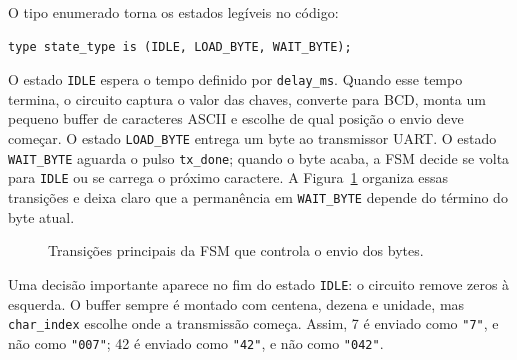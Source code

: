 \documentclass[12pt,a4paper]{book}
\begin{document}
O tipo enumerado torna os estados legíveis no código:

\begin{lstlisting}[caption={Estados usados para controlar o envio da linha.}]
type state_type is (IDLE, LOAD_BYTE, WAIT_BYTE);
\end{lstlisting}

O estado \texttt{IDLE} espera o tempo definido por \texttt{delay\_ms}. Quando esse tempo termina, o circuito captura o valor das chaves, converte para BCD, monta um pequeno buffer de caracteres ASCII e escolhe de qual posição o envio deve começar. O estado \texttt{LOAD\_BYTE} entrega um byte ao transmissor UART. O estado \texttt{WAIT\_BYTE} aguarda o pulso \texttt{tx\_done}; quando o byte acaba, a FSM decide se volta para \texttt{IDLE} ou se carrega o próximo caractere. A Figura~\ref{fig:fsm-envio} organiza essas transições e deixa claro que a permanência em \texttt{WAIT\_BYTE} depende do término do byte atual.

\begin{figure}[h]
\centering
{}
\caption{Transições principais da FSM que controla o envio dos bytes.}
\label{fig:fsm-envio}
\end{figure}

Uma decisão importante aparece no fim do estado \texttt{IDLE}: o circuito remove zeros à esquerda. O buffer sempre é montado com centena, dezena e unidade, mas \texttt{char\_index} escolhe onde a transmissão começa. Assim, 7 é enviado como \texttt{"7"}, e não como \texttt{"007"}; 42 é enviado como \texttt{"42"}, e não como \texttt{"042"}.
\end{document}
